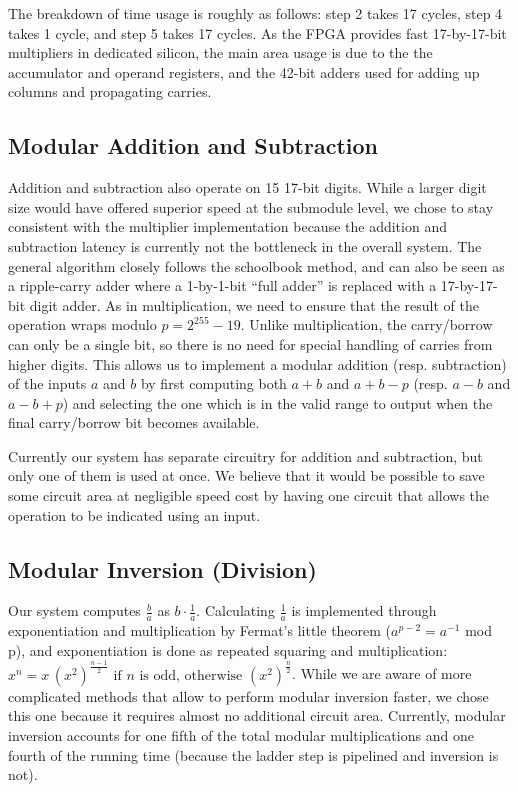 The breakdown of time usage is roughly as follows: step 2 takes 17
cycles, step 4 takes 1 cycle, and step 5 takes 17 cycles. As the FPGA
provides fast 17-by-17-bit multipliers in dedicated silicon, the main
area usage is due to the the accumulator and operand registers, and the
42-bit adders used for adding up columns and propagating carries.

\subsection{Modular Addition and
Subtraction}\label{modular-addition-and-subtraction}

Addition and subtraction also operate on 15 17-bit digits. While a
larger digit size would have offered superior speed at the submodule
level, we chose to stay consistent with the multiplier implementation
because the addition and subtraction latency is currently not the
bottleneck in the overall system. The general algorithm closely follows
the schoolbook method, and can also be seen as a ripple-carry adder
where a 1-by-1-bit ``full adder'' is replaced with a 17-by-17-bit digit
adder. As in multiplication, we need to ensure that the result of the
operation wraps modulo \(p=2^{255}-19\). Unlike multiplication, the
carry/borrow can only be a single bit, so there is no need for special
handling of carries from higher digits. This allows us to implement a
modular addition (resp. subtraction) of the inputs \(a\) and \(b\) by
first computing both \(a+b\) and \(a+b-p\) (resp. \(a-b\) and \(a-b+p\))
and selecting the one which is in the valid range to output when the
final carry/borrow bit becomes available.

Currently our system has separate circuitry for addition and
subtraction, but only one of them is used at once. We believe that it
would be possible to save some circuit area at negligible speed cost by
having one circuit that allows the operation to be indicated using an
input.

\subsection{Modular Inversion
(Division)}\label{modular-inversion-division}

Our system computes \(\frac{b}{a}\) as \(b\cdot\frac{1}{a}\).
Calculating \(\frac{1}{a}\) is implemented through exponentiation and
multiplication by Fermat's little theorem (\(a^{p-2} = a^{-1}\) mod p),
and exponentiation is done as repeated squaring and multiplication:
\(x^n= x \, ( x^{2})^{\frac{n - 1}{2}} \mbox{ if } n \mbox{ is odd, otherwise } (x^{2})^{\frac{n}{2}}\).
While we are aware of more complicated methods that allow to perform
modular inversion faster, we chose this one because it requires almost
no additional circuit area. Currently, modular inversion accounts for
one fifth of the total modular multiplications and one fourth of the
running time (because the ladder step is pipelined and inversion is
not).


